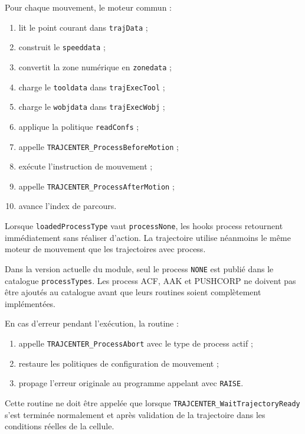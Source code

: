 \documentclass{rapportENSAM}
\begin{document}
Pour chaque mouvement, le moteur commun :

\begin{enumerate}
    \item lit le point courant dans \texttt{trajData} ;
    \item construit le \texttt{speeddata} ;
    \item convertit la zone numérique en \texttt{zonedata} ;
    \item charge le \texttt{tooldata} dans
    \texttt{trajExecTool} ;
    \item charge le \texttt{wobjdata} dans
    \texttt{trajExecWobj} ;
    \item applique la politique \texttt{readConfs} ;
    \item appelle \texttt{TRAJCENTER\_ProcessBeforeMotion} ;
    \item exécute l'instruction de mouvement ;
    \item appelle \texttt{TRAJCENTER\_ProcessAfterMotion} ;
    \item avance l'index de parcours.
\end{enumerate}

Lorsque \texttt{loadedProcessType} vaut \texttt{processNone}, les hooks
process retournent immédiatement sans réaliser d'action. La trajectoire
utilise néanmoins le même moteur de mouvement que les trajectoires avec
process.

Dans la version actuelle du module, seul le process \texttt{NONE} est publié
dans le catalogue \texttt{processTypes}. Les process ACF, AAK et PUSHCORP ne
doivent pas être ajoutés au catalogue avant que leurs routines soient
complètement implémentées.

En cas d'erreur pendant l'exécution, la routine :

\begin{enumerate}
    \item appelle \texttt{TRAJCENTER\_ProcessAbort} avec le type de process
    actif ;
    \item restaure les politiques de configuration de mouvement ;
    \item propage l'erreur originale au programme appelant avec
    \texttt{RAISE}.
\end{enumerate}

Cette routine ne doit être appelée que lorsque
\texttt{TRAJCENTER\_WaitTrajectoryReady} s'est terminée normalement et après
validation de la trajectoire dans les conditions réelles de la cellule.
\end{document}
